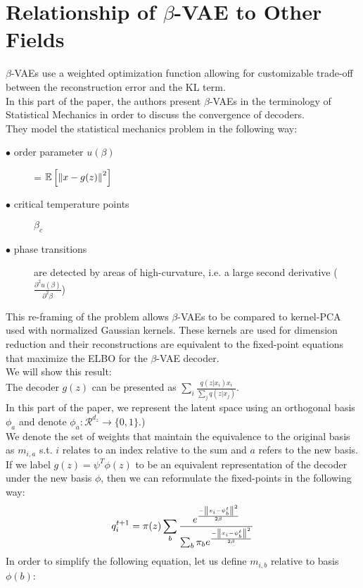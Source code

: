 \chapter*{Relationship of $\beta$-VAE to Other Fields}
$\beta$-VAEs use a weighted optimization function allowing for customizable trade-off between the reconstruction error and the KL term.\\
In this part of the paper, the authors present $\beta$-VAEs in the terminology of Statistical Mechanics in order to discuss the convergence of decoders.\\
They model the statistical mechanics problem in the following way:
\begin{description}
  \item[$\bullet$ order parameter $u(\beta)$] = $\operatorname{\mathbb{E}}\left[\left\lVert x - g(z)\right\rVert^2\right]$
  \item[$\bullet$ critical temperature points] $\beta_c$
  \item[$\bullet$ phase transitions] are detected by areas of high-curvature, i.e. a large second derivative ($\frac{\partial^2 u(\beta)}{\partial^2 \beta}$)
\end{description}
This re-framing of the problem allows $\beta$-VAEs to be compared to kernel-PCA used with normalized Gaussian kernels. These kernels are used for dimension reduction and their reconstructions are equivalent to the fixed-point equations that maximize the ELBO for the $\beta$-VAE decoder.\\
We will show this result:\\
The decoder $g(z)$ can be presented as $\sum_i\frac{q(z|x_i)x_i}{\sum_j{q(z|x_j)}}$.\\
In this part of the paper, we represent the latent space using an orthogonal basis $\phi_a$ and denote $\phi_a:\mathcal{R}^{d_z}\to\{0,1\}$.) \\
We denote the set of weights that maintain the equivalence to the original basis as $m_{i,a}$ s.t. $i$ relates to an index relative to the sum and $a$ refers to the new basis.\\
If we label $g(z) = \psi^T\phi(z)$ to be an equivalent representation of the decoder under the new basis $\phi$, then we can reformulate the fixed-points in the following way:
\begin{gather*}
q_i^{t+1} = \pi(z)\sum_b\frac{e^\frac{-\left\lVert x_i - \psi_b^t\right\rVert^2}{2\beta}}{\sum_b \pi_be^\frac{-\left\lVert x_i-\psi_b^t\right\rVert^2}{2\beta}}
\end{gather*}
In order to simplify the following equation, let us define $m_{i,b}$ relative to basis $\phi(b)$:
